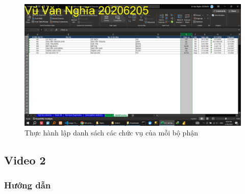 \documentclass{article}
\begin{document}


\begin{figure}[h]
    \centering
    \includegraphics[scale = 0.15]{Video1/ThucHanh/6.png}
    \caption{Thực hành  lập danh  sách các chức vụ của mỗi bộ phận}
\end{figure}



\newpage
\subsection{Video 2}
\subsubsection{Hướng dẫn}








\end{document}
